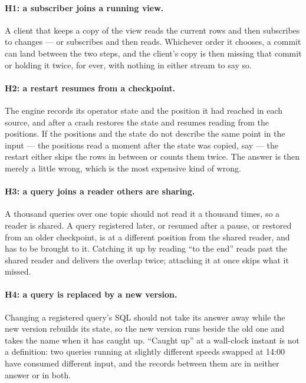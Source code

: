 \documentclass[11pt,a4paper]{article}
\renewcommand{\_}{\oldunderscore\allowbreak}
\begin{document}
\paragraph{H1: a subscriber joins a running view.} A client that keeps a copy of the view reads the
current rows and then subscribes to changes --- or subscribes and then reads. Whichever order it
chooses, a commit can land between the two steps, and the client's copy is then missing that commit
or holding it twice, for ever, with nothing in either stream to say so.

\paragraph{H2: a restart resumes from a checkpoint.} The engine records its operator state and the
position it had reached in each source, and after a crash restores the state and resumes reading
from the positions. If the positions and the state do not describe the same point in the input ---
the positions read a moment after the state was copied, say --- the restart either skips the rows in
between or counts them twice. The answer is then merely a little wrong, which is the most expensive
kind of wrong.

\paragraph{H3: a query joins a reader others are sharing.} A thousand queries over one topic should
not read it a thousand times, so a reader is shared. A query registered later, or resumed after a
pause, or restored from an older checkpoint, is at a different position from the shared reader, and
has to be brought to it. Catching it up by reading ``to the end'' reads past the shared reader and
delivers the overlap twice; attaching it at once skips what it missed.

\paragraph{H4: a query is replaced by a new version.} Changing a registered query's SQL should not
take its answer away while the new version rebuilds its state, so the new version runs beside the old
one and takes the name when it has caught up. ``Caught up'' at a wall-clock instant is not a
definition: two queries running at slightly different speeds swapped at 14:00 have consumed
different input, and the records between them are in neither answer or in both.
\end{document}
